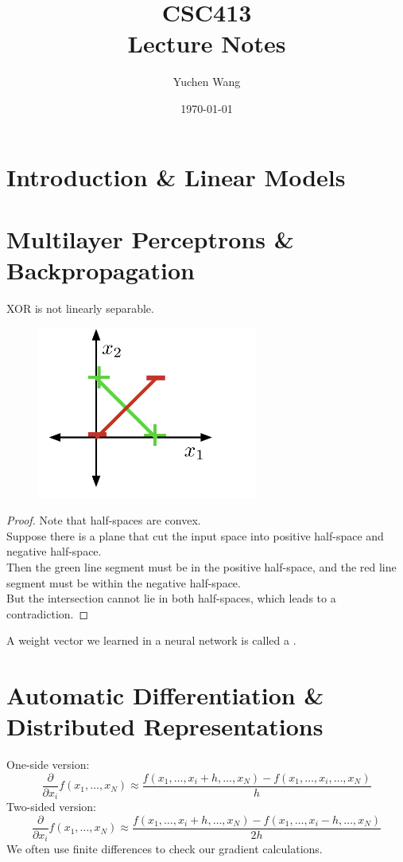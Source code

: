 \documentclass[11pt]{article}
\title{CSC413\\ Lecture Notes}
\author{Yuchen Wang}
\date{\today}
\begin{document}
    \maketitle
    \tableofcontents
    \newpage
\section{Introduction \& Linear Models}
\section{Multilayer Perceptrons \& Backpropagation}
\fact
XOR is not linearly separable.
	\begin{figure}[H]
		\centering
		\includegraphics[scale=1]{p3.png}
	\end{figure}
\begin{proof}
	Note that half-spaces are convex.\\
	Suppose there is a plane that cut the input space into positive half-space and negative half-space. \\
	Then the green line segment must be in the positive half-space, and the red line segment must be within the negative half-space.\\
	But the intersection cannot lie in both half-spaces, which leads to a contradiction.
\end{proof}

A weight vector we learned in a neural network is called a .



\section{Automatic Differentiation \& Distributed Representations}
One-side version:
$$\frac{\partial }{\partial x_i}f(x_1, \hdots, x_N) \approx \frac{f(x_1, \hdots, x_i + h, \hdots, x_N) - f(x_1, \hdots, x_i, \hdots, x_N)}{h}$$
Two-sided version:
$$\frac{\partial }{\partial x_i}f(x_1, \hdots, x_N) \approx \frac{f(x_1, \hdots, x_i + h, \hdots, x_N) - f(x_1, \hdots, x_i - h, \hdots, x_N)}{2h}$$
\remark
We often use finite differences to check our gradient calculations.
\end{document}
